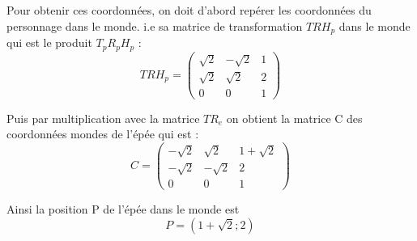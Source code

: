 \documentclass[a4paper,12pt]{article}
\begin{document}
\begin{enumerate}
Pour obtenir ces coordonnées, on doit d'abord repérer les coordonnées du personnage dans le monde. i.e sa matrice de transformation $TRH_p$ dans le monde qui est le produit $T_p R_p H_p$ :
 \begin{equation}\boxed{
TRH_p = 
\begin{pmatrix}
\sqrt{2} & -\sqrt{2} & 1 \\
\sqrt{2} & \sqrt{2} & 2 \\
0 & 0 & 1
\end{pmatrix}} \end{equation}

Puis par multiplication avec la matrice $TR_e$ on obtient la matrice C des coordonnées mondes de l'épée qui est :
 \begin{equation}\boxed{
C = 
\begin{pmatrix}
-\sqrt{2} & \sqrt{2} & 1+\sqrt{2} \\
-\sqrt{2} & -\sqrt{2} & 2 \\
0 & 0 & 1
\end{pmatrix}} \end{equation}

Ainsi la position P de l'épée dans le monde est 
\[\boxed{
P =  (1+\sqrt{2};2)} 
\]

\end{enumerate}

\newpage
\end{document}
